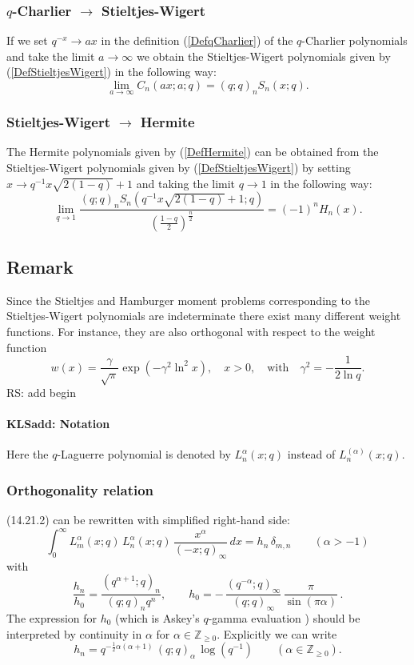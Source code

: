 \documentclass[envcountchap,graybox]{svmono}
\newcounter{rom}
\newcommand\ZZ{\mathbb{Z}}
\newcommand\al\alpha
\newcommand\de\delta
\newcommand\half{\frac12}
\newcommand\iy\infty
\newcommand\Znonneg{\ZZ_{\ge0}}
\newcommand\RHS{right-hand side}
\begin{document}
{{\subsubsection*{$q$-Charlier $\rightarrow$ Stieltjes-Wigert}
If we set $q^{-x}\rightarrow ax$ in the definition (\ref{DefqCharlier}) of the
$q$-Charlier polynomials and take the limit $a\rightarrow\infty$ we obtain
the Stieltjes-Wigert polynomials given by (\ref{DefStieltjesWigert}) in the
following way:
$$\lim_{a\rightarrow\infty}C_n(ax;a;q)=(q;q)_nS_n(x;q).$$

\subsubsection*{Stieltjes-Wigert $\rightarrow$ Hermite}
The Hermite polynomials given by (\ref{DefHermite}) can be obtained from
the Stieltjes-Wigert polynomials given by (\ref{DefStieltjesWigert}) by
setting $x\rightarrow q^{-1}x\sqrt{2(1-q)}+1$ and taking the limit
$q\rightarrow 1$ in the following way:
\begin{equation}
\lim_{q\rightarrow 1}\frac{(q;q)_nS_n(q^{-1}x\sqrt{2(1-q)}+1;q)}
{\left(\frac{1-q}{2}\right)^{\frac{n}{2}}}=(-1)^nH_n(x).
\end{equation}

\subsection*{Remark} Since the Stieltjes and Hamburger moment problems corresponding
to the Stieltjes-Wigert polynomials are indeterminate there exist many
different weight functions. For instance, they are also orthogonal with
respect to the weight function
$$w(x)=\frac{\gamma}{\sqrt{\pi}}\exp\left(-\gamma^2\ln^2x\right),\quad x>0,\quad\textrm{with}\quad
\gamma^2=-\frac{1}{2\ln q}.$$
 RS: add begin\label{sec14.21}
%
\paragraph{\large\bf KLSadd: Notation}Here the $q$-Laguerre polynomial is denoted by $L_n^\al(x;q)$ instead of
$L_n^{(\al)}(x;q)$.
%
\subsubsection*{Orthogonality relation}
(14.21.2) can be rewritten with simplified \RHS:
\begin{equation}
\int_0^\iy L_m^{\al}(x;q)\,L_n^{\al}(x;q)\,\frac{x^\al}{(-x;q)_\iy}\,dx=h_n\,\de_{m,n}
\qquad(\al>-1)
\label{119}
\end{equation}
with
\begin{equation}
\frac{h_n}{h_0}=\frac{(q^{\al+1};q)_n}{(q;q)_n q^n},\qquad
h_0=-\,\frac{(q^{-\al};q)_\iy}{(q;q)_\iy}\,\frac\pi{\sin(\pi\al)}\,.
\label{120}
\end{equation}
The expression for $h_0$ (which is Askey's $q$-gamma evaluation
\cite[(4.2)]{K16})
should be interpreted by continuity in $\al$ for
$\al\in\Znonneg$.
Explicitly we can write
\begin{equation}
h_n=q^{-\half\al(\al+1)}\,(q;q)_\al\,\log(q^{-1})\qquad(\al\in\Znonneg).
\label{121}
\end{equation}
%
}}
\end{document}

